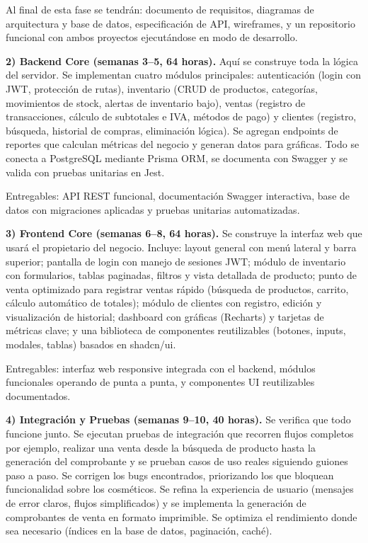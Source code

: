 \documentclass[spanish]{ieee_upb}
\begin{document}
Al final de esta fase se tendrán: documento de requisitos, diagramas de arquitectura y base de datos, especificación de API, wireframes, y un repositorio funcional con ambos proyectos ejecutándose en modo de desarrollo.

\textbf{2) Backend Core (semanas 3--5, 64 horas).} Aquí se construye toda la lógica del servidor. Se implementan cuatro módulos principales: autenticación (login con JWT, protección de rutas), inventario (CRUD de productos, categorías, movimientos de stock, alertas de inventario bajo), ventas (registro de transacciones, cálculo de subtotales e IVA, métodos de pago) y clientes (registro, búsqueda, historial de compras, eliminación lógica). Se agregan endpoints de reportes que calculan métricas del negocio y generan datos para gráficas. Todo se conecta a PostgreSQL mediante Prisma ORM, se documenta con Swagger y se valida con pruebas unitarias en Jest.

Entregables: API REST funcional, documentación Swagger interactiva, base de datos con migraciones aplicadas y pruebas unitarias automatizadas.

\textbf{3) Frontend Core (semanas 6--8, 64 horas).} Se construye la interfaz web que usará el propietario del negocio. Incluye: layout general con menú lateral y barra superior; pantalla de login con manejo de sesiones JWT; módulo de inventario con formularios, tablas paginadas, filtros y vista detallada de producto; punto de venta optimizado para registrar ventas rápido (búsqueda de productos, carrito, cálculo automático de totales); módulo de clientes con registro, edición y visualización de historial; dashboard con gráficas (Recharts) y tarjetas de métricas clave; y una biblioteca de componentes reutilizables (botones, inputs, modales, tablas) basados en shadcn/ui.

Entregables: interfaz web responsive integrada con el backend, módulos funcionales operando de punta a punta, y componentes UI reutilizables documentados.

\textbf{4) Integración y Pruebas (semanas 9--10, 40 horas).} Se verifica que todo funcione junto. Se ejecutan pruebas de integración que recorren flujos completos por ejemplo, realizar una venta desde la búsqueda de producto hasta la generación del comprobante  y se prueban casos de uso reales siguiendo guiones paso a paso. Se corrigen los bugs encontrados, priorizando los que bloquean funcionalidad sobre los cosméticos. Se refina la experiencia de usuario (mensajes de error claros, flujos simplificados) y se implementa la generación de comprobantes de venta en formato imprimible. Se optimiza el rendimiento donde sea necesario (índices en la base de datos, paginación, caché).
\end{document}
